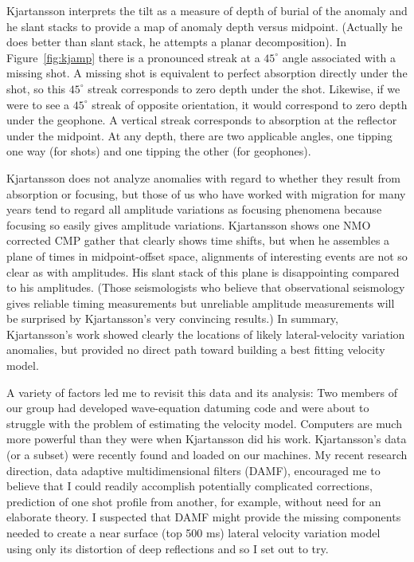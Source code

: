 Kjartansson interprets the tilt as a measure of depth of burial
of the anomaly and he slant stacks to provide a map of
anomaly depth versus midpoint.
(Actually he does better than slant stack,
he attempts a planar decomposition).
In Figure~\ref{fig:kjamp} there is a pronounced streak at a
$45^\circ$ angle associated with a missing shot.
A missing shot is equivalent to perfect absorption directly under
the shot, so this $45^\circ$ streak corresponds to zero depth
under the shot.
Likewise, if we were to see a $45^\circ$ streak of opposite orientation,
it would correspond to zero depth under the geophone.
A vertical streak corresponds to absorption
at the reflector under the midpoint.
At any depth, there are two applicable angles, one tipping one way
(for shots) and one tipping the other (for geophones).

\par
Kjartansson does not analyze anomalies with regard to whether
they result from  absorption or focusing,
but those of us who have worked with migration for many years
tend to regard all amplitude variations as focusing phenomena because
focusing so easily gives amplitude variations.
Kjartansson shows one NMO corrected CMP gather
that clearly shows time shifts,
but when he assembles a plane of times in midpoint-offset space,
alignments of interesting events are not so clear as with amplitudes.
His slant stack of this plane is disappointing compared to his amplitudes.
(Those seismologists who believe that observational seismology
gives reliable timing measurements but unreliable amplitude measurements
will be surprised by Kjartansson's very convincing results.)
In summary, Kjartansson's work showed clearly the locations
of likely lateral-velocity variation anomalies, but provided
no direct path toward building a best fitting velocity model.

\par
A variety of factors led me to revisit this data and its analysis:
Two members of our group had developed wave-equation datuming code
and were about to struggle with the problem of estimating the velocity model.
Computers are much more powerful than they were when Kjartansson did his work.
Kjartansson's data (or a subset) were recently found and loaded on our machines.
My recent research direction,
data adaptive multidimensional filters (DAMF), encouraged me to believe
that I could readily accomplish potentially complicated corrections,
prediction of one shot profile from another, for example,
without need for an elaborate theory.
I suspected that DAMF might provide the missing components
needed to create a near surface (top 500 ms)
lateral velocity variation model
using only its distortion of deep reflections and so I set out to try.

